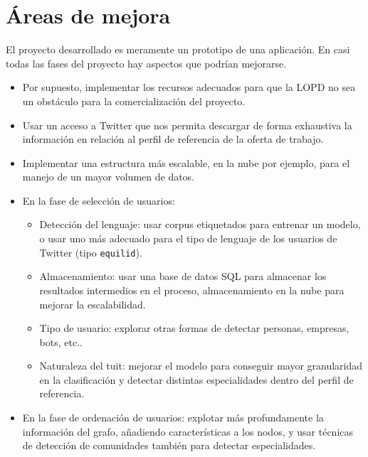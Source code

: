 \chapter{\'Areas de mejora}

El proyecto desarrollado es meramente un prototipo de una aplicación.
En casi todas las fases del proyecto hay aspectos que podrían
mejorarse.
\begin{itemize} 
\item Por supuesto, implementar los recursos adecuados para que la 
LOPD no sea un obstáculo para la comercialización del proyecto.
\item Usar un acceso a Twitter que nos permita descargar de forma exhaustiva
la información en relación al perfil de referencia de la oferta de trabajo.
\item Implementar una estructura más escalable, en la nube por ejemplo,
para el manejo de un mayor volumen de datos.
\item En la fase de selección de usuarios:
\begin{itemize}
\item Detección del lenguaje: usar corpus etiquetados para entrenar un modelo,
o usar uno más adecuado para el tipo de lenguaje de los usuarios de Twitter 
(tipo {\tt equilid}).
\item Almacenamiento: usar una base de datos SQL para almacenar los resultados 
intermedios en el proceso, almacenamiento en la nube para mejorar la escalabilidad.
\item Tipo de usuario: explorar otras formas de detectar personas, empresas, bots, etc..
\item Naturaleza del tuit: mejorar el modelo para conseguir mayor granularidad en
la clasificación y detectar distintas especialidades dentro del perfil de referencia.
\end{itemize} 
\item En la fase de ordenación de usuarios: explotar más profundamente la información
del grafo, añadiendo características a los nodos, y usar técnicas de detección de comunidades
también para detectar especialidades.
\end{itemize} 